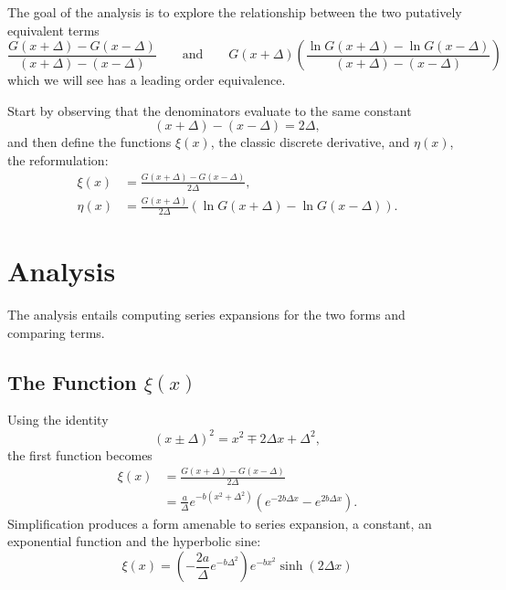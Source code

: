 \documentclass[10pt, oneside]{article}
\newcommand{\paren}[1]			{ \left(  #1 \right) }
\begin{document}
The goal of the analysis is to explore the relationship between the two putatively equivalent terms 
$$ \frac{G\paren{x + \Delta} - G\paren{x - \Delta}}{(x + \Delta) - (x - \Delta)}  \qquad \text{and} \qquad 
G\paren{x + \Delta}  \paren{\frac{\ln G\paren{x + \Delta} - \ln G\paren{x - \Delta}} {(x + \Delta) - (x - \Delta)}}$$
which we will see has a leading order equivalence.

Start by observing that the denominators evaluate to the same constant 
$$(x + \Delta) - (x - \Delta) = 2\Delta,$$
and then define the functions $\xi(x)$, the classic discrete derivative, and $\eta(x)$, the reformulation:
\begin{equation}
	\begin{split}
		\xi (x) &= \frac {G\paren{x + \Delta} - G\paren{x - \Delta}} {2\Delta}, \\
		\eta (x) &= \frac {G\paren{x + \Delta}} {2\Delta} \paren{\ln G\paren{x + \Delta} - \ln G\paren{x - \Delta}}.
	\end{split}
\label{eq:both}
\end{equation}

\section{Analysis} %
The analysis entails computing series expansions for the two forms and comparing terms.

\subsection{The Function $\xi(x)$}
Using the identity 
\begin{equation}
	\paren{x \pm \Delta}^{2} = x^{2} \mp 2\Delta x + \Delta^{2},
\end{equation}
the first function becomes
\begin{equation}
	\begin{split}
		\xi (x) &= \frac{G\paren{x + \Delta} - G\paren{x - \Delta}} {2\Delta} \\
			&=  \frac{a}{\Delta} e^{-b\paren{x^{2} +\Delta^{2}}} \paren{ e^{-2b\Delta x} - e^{2b\Delta x} }.
	\end{split}
\end{equation}
Simplification produces a form amenable to series expansion, a constant, an exponential function and the hyperbolic sine:
\begin{equation}
	\xi (x) = \paren{-\frac{2a}{\Delta} e^{-b\Delta^{2}}} e^{-bx^{2}} \sinh \paren{2\Delta x}
\label{eq:xi}
\end{equation}
\end{document}

